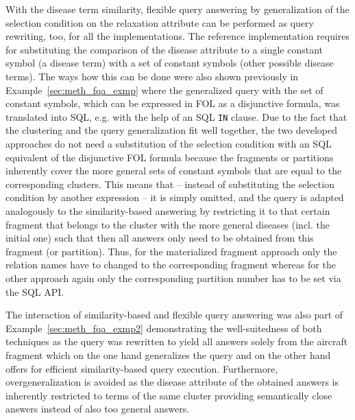 With the disease term similarity, flexible query answering by generalization of the selection condition on the relaxation attribute can be performed
as query rewriting, too, for all the implementations. The reference implementation requires for substituting the comparison of the disease attribute to a 
single constant symbol (a disease term) with a set of constant symbols (other possible disease terms). The ways how this can be done were also shown previously 
in Example~\ref{sec:meth_fqa_exmp} where the generalized query with the set of constant symbols, which can be expressed in FOL as a disjunctive formula, was
translated into SQL, e.g. with the help of an SQL \verb!IN! clause. Due to the fact that the clustering and the query generalization fit well together, the two
developed approaches do not need a substitution of the selection condition with an SQL equivalent of the disjunctive FOL formula because the fragments or
partitions inherently cover the more general sets of constant symbols that are equal to the corresponding clusters. This means that -- instead of substituting
the selection condition by another expression -- it is simply omitted, and the query is adapted analogously to the similarity-based answering by restricting it 
to that certain fragment that belongs to the cluster with the more general diseases (incl. the initial one) such that then all answers only need to be obtained
from this fragment (or partition). Thus, for the materialized fragment approach only the relation names have to changed to the corresponding fragment whereas
for the other approach again only the corresponding partition number has to be set via the SQL API. 

The interaction of similarity-based and flexible query answering was also part of Example~\ref{sec:meth_fqa_exmp2} demonstrating the well-suitedness of both
techniques as the query was rewritten to yield all answers solely from the aircraft fragment which on the one hand generalizes the query and on the other hand
offers for efficient similarity-based query execution. Furthermore, overgeneralization \citep{Wiese2014} is avoided as the disease attribute of the obtained 
answers is inherently restricted to terms of the same cluster providing semantically close answers instead of also too general answers.


